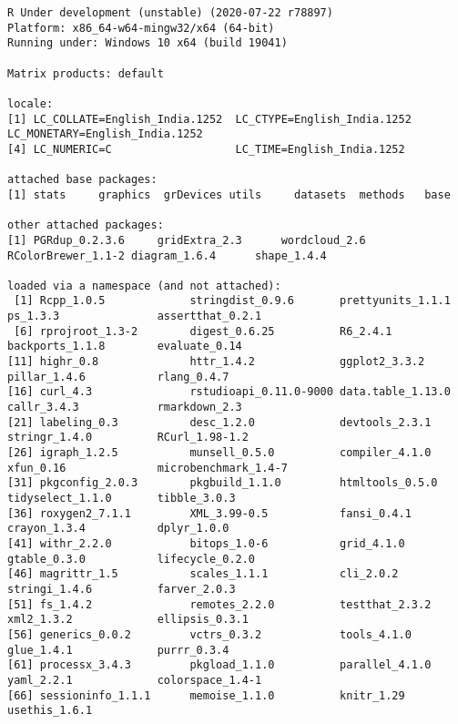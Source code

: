 \documentclass[
]{article}
\begin{document}
\begin{verbatim}
R Under development (unstable) (2020-07-22 r78897)
Platform: x86_64-w64-mingw32/x64 (64-bit)
Running under: Windows 10 x64 (build 19041)

Matrix products: default

locale:
[1] LC_COLLATE=English_India.1252  LC_CTYPE=English_India.1252    LC_MONETARY=English_India.1252
[4] LC_NUMERIC=C                   LC_TIME=English_India.1252    

attached base packages:
[1] stats     graphics  grDevices utils     datasets  methods   base     

other attached packages:
[1] PGRdup_0.2.3.6     gridExtra_2.3      wordcloud_2.6      RColorBrewer_1.1-2 diagram_1.6.4      shape_1.4.4       

loaded via a namespace (and not attached):
 [1] Rcpp_1.0.5             stringdist_0.9.6       prettyunits_1.1.1      ps_1.3.3               assertthat_0.2.1      
 [6] rprojroot_1.3-2        digest_0.6.25          R6_2.4.1               backports_1.1.8        evaluate_0.14         
[11] highr_0.8              httr_1.4.2             ggplot2_3.3.2          pillar_1.4.6           rlang_0.4.7           
[16] curl_4.3               rstudioapi_0.11.0-9000 data.table_1.13.0      callr_3.4.3            rmarkdown_2.3         
[21] labeling_0.3           desc_1.2.0             devtools_2.3.1         stringr_1.4.0          RCurl_1.98-1.2        
[26] igraph_1.2.5           munsell_0.5.0          compiler_4.1.0         xfun_0.16              microbenchmark_1.4-7  
[31] pkgconfig_2.0.3        pkgbuild_1.1.0         htmltools_0.5.0        tidyselect_1.1.0       tibble_3.0.3          
[36] roxygen2_7.1.1         XML_3.99-0.5           fansi_0.4.1            crayon_1.3.4           dplyr_1.0.0           
[41] withr_2.2.0            bitops_1.0-6           grid_4.1.0             gtable_0.3.0           lifecycle_0.2.0       
[46] magrittr_1.5           scales_1.1.1           cli_2.0.2              stringi_1.4.6          farver_2.0.3          
[51] fs_1.4.2               remotes_2.2.0          testthat_2.3.2         xml2_1.3.2             ellipsis_0.3.1        
[56] generics_0.0.2         vctrs_0.3.2            tools_4.1.0            glue_1.4.1             purrr_0.3.4           
[61] processx_3.4.3         pkgload_1.1.0          parallel_4.1.0         yaml_2.2.1             colorspace_1.4-1      
[66] sessioninfo_1.1.1      memoise_1.1.0          knitr_1.29             usethis_1.6.1         
\end{verbatim}
\end{document}
